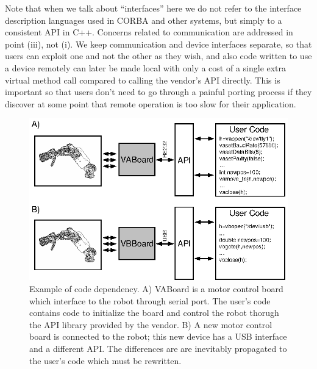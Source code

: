 Note that when we talk about ``interfaces'' here we do not refer to
the interface description languages used in CORBA and other systems,
but simply to a consistent API in C++.  Concerns related to
communication are addressed in point (iii), not (i).  We keep
communication and device interfaces separate, so that users can
exploit one and not the other as they wish, and also code written to
use a device remotely can later be made local with only a cost of a
single extra virtual method call compared to calling the vendor's API directly.
This is important so that users don't need to go through a painful
porting process if they discover at some point that remote operation
is too slow for their application.

\begin{figure}[tbp]
\centerline{
\includegraphics[width=24cm]{fig-devices1}
}
\caption{Example of code dependency. A) VABoard is a 
motor control board which interface to the robot through serial port. 
The user's code contains code to initialize the board and control the 
robot thorugh the API library provided by the vendor. B) A new 
motor control board is connected to the robot; this new device has a 
USB interface and a different API. The differences are 
are inevitably propagated to the user's code which must be 
rewritten.}\label{fig:devices1}
\end{figure}

